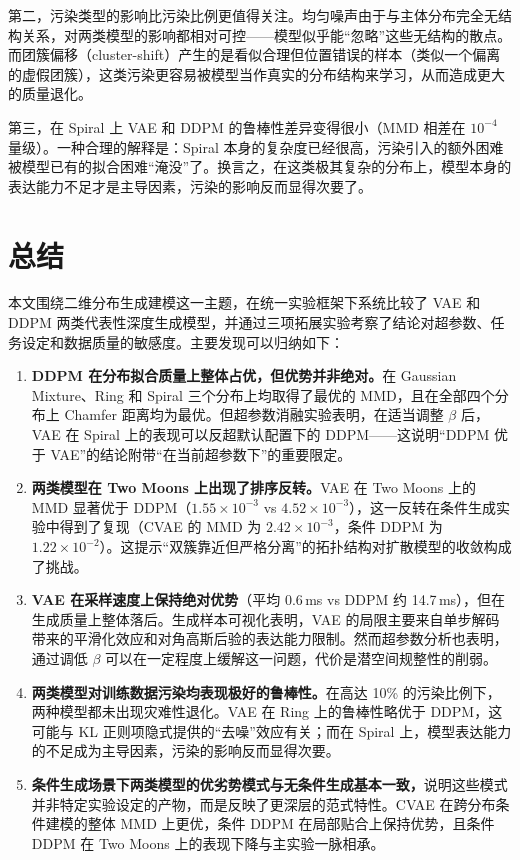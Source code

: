 \documentclass[UTF8,a4paper,12pt]{ctexart}
\begin{document}
第二，污染类型的影响比污染比例更值得关注。均匀噪声由于与主体分布完全无结构关系，对两类模型的影响都相对可控——模型似乎能“忽略”这些无结构的散点。而团簇偏移（cluster-shift）产生的是看似合理但位置错误的样本（类似一个偏离的虚假团簇），这类污染更容易被模型当作真实的分布结构来学习，从而造成更大的质量退化。

第三，在 Spiral 上 VAE 和 DDPM 的鲁棒性差异变得很小（MMD 相差在 $10^{-4}$ 量级）。一种合理的解释是：Spiral 本身的复杂度已经很高，污染引入的额外困难被模型已有的拟合困难“淹没”了。换言之，在这类极其复杂的分布上，模型本身的表达能力不足才是主导因素，污染的影响反而显得次要了。

\section{总结}

本文围绕二维分布生成建模这一主题，在统一实验框架下系统比较了 VAE 和 DDPM 两类代表性深度生成模型，并通过三项拓展实验考察了结论对超参数、任务设定和数据质量的敏感度。主要发现可以归纳如下：

\begin{enumerate}
    \item \textbf{DDPM 在分布拟合质量上整体占优，但优势并非绝对。}在 Gaussian Mixture、Ring 和 Spiral 三个分布上均取得了最优的 MMD，且在全部四个分布上 Chamfer 距离均为最优。但超参数消融实验表明，在适当调整 $\beta$ 后，VAE 在 Spiral 上的表现可以反超默认配置下的 DDPM——这说明“DDPM 优于 VAE”的结论附带“在当前超参数下”的重要限定。

    \item \textbf{两类模型在 Two Moons 上出现了排序反转。}VAE 在 Two Moons 上的 MMD 显著优于 DDPM（$1.55\times 10^{-3}$ vs $4.52\times 10^{-3}$），这一反转在条件生成实验中得到了复现（CVAE 的 MMD 为 $2.42\times 10^{-3}$，条件 DDPM 为 $1.22\times 10^{-2}$）。这提示“双簇靠近但严格分离”的拓扑结构对扩散模型的收敛构成了挑战。

    \item \textbf{VAE 在采样速度上保持绝对优势}（平均 0.6\,ms vs DDPM 约 14.7\,ms），但在生成质量上整体落后。生成样本可视化表明，VAE 的局限主要来自单步解码带来的平滑化效应和对角高斯后验的表达能力限制。然而超参数分析也表明，通过调低 $\beta$ 可以在一定程度上缓解这一问题，代价是潜空间规整性的削弱。

    \item \textbf{两类模型对训练数据污染均表现极好的鲁棒性。}在高达 10\% 的污染比例下，两种模型都未出现灾难性退化。VAE 在 Ring 上的鲁棒性略优于 DDPM，这可能与 KL 正则项隐式提供的“去噪”效应有关；而在 Spiral 上，模型表达能力的不足成为主导因素，污染的影响反而显得次要。

    \item \textbf{条件生成场景下两类模型的优劣势模式与无条件生成基本一致，}说明这些模式并非特定实验设定的产物，而是反映了更深层的范式特性。CVAE 在跨分布条件建模的整体 MMD 上更优，条件 DDPM 在局部贴合上保持优势，且条件 DDPM 在 Two Moons 上的表现下降与主实验一脉相承。
\end{enumerate}
\end{document}
